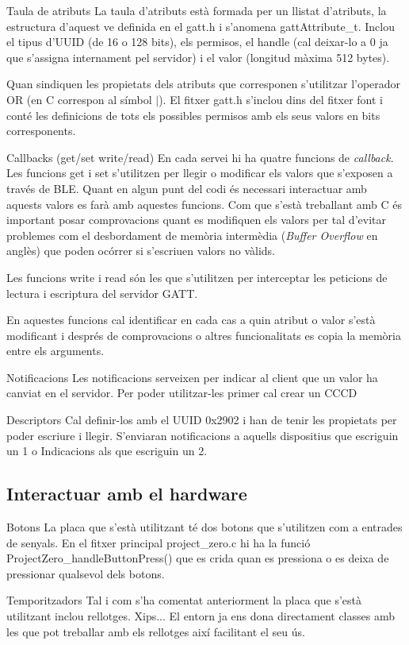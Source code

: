 Taula de atributs
La taula d'atributs està formada per un llistat d'atributs, la estructura d'aquest ve definida en el gatt.h i s'anomena gattAttribute\_t.
Inclou el tipus d'UUID (de 16 o 128 bits), els permisos, el handle (cal deixar-lo a 0 ja que s'assigna internament pel servidor) i el valor (longitud màxima 512 bytes).

Quan sindiquen les propietats dels atributs que corresponen s'utilitzar l'operador OR (en C correspon al símbol $\mid$).
El fitxer gatt.h s'inclou dins del fitxer font i conté les definicions de tots els possibles permisos amb els seus valors en bits corresponents.

Callbacks (get/set write/read)
En cada servei hi ha quatre funcions de \textit{callback}.
Les funcions get i set s'utilitzen per llegir o modificar els valors que s'exposen a través de BLE.
Quant en algun punt del codi és necessari interactuar amb aquests valors es farà amb aquestes funcions.
Com que s'està treballant amb C és important posar comprovacions quant es modifiquen els valors per tal d'evitar problemes com el desbordament de memòria intermèdia (\textit{Buffer Overflow} en anglès) que poden ocórrer si s'escriuen valors no vàlids.

Les funcions write i read són les que s'utilitzen per interceptar les peticions de lectura i escriptura del servidor GATT.

En aquestes funcions cal identificar en cada cas a quin atribut o valor s'està modificant i després de comprovacions o altres funcionalitats es copia la memòria entre els arguments.

Notificacions
Les notificacions serveixen per indicar al client que un valor ha canviat en el servidor.
Per poder utilitzar-les primer cal crear un CCCD

Descriptors
Cal definir-los amb el UUID 0x2902 i han de tenir les propietats per poder escriure i llegir.
S'enviaran notificacions a aquells dispositius que escriguin un 1 o Indicacions als que escriguin un 2.


\subsection{Interactuar amb el hardware}

Botons
La placa que s'està utilitzant té dos botons que s'utilitzen com a entrades de senyals.
En el fitxer principal project\_zero.c hi ha la funció ProjectZero\_handleButtonPress() que es crida quan es pressiona o es deixa de pressionar qualsevol dels botons.


Temporitzadors
Tal i com s'ha comentat anteriorment la placa que s'està utilitzant inclou rellotges.
Xips...
El entorn ja ens dona directament classes amb les que pot treballar amb els rellotges així facilitant el seu ús.




